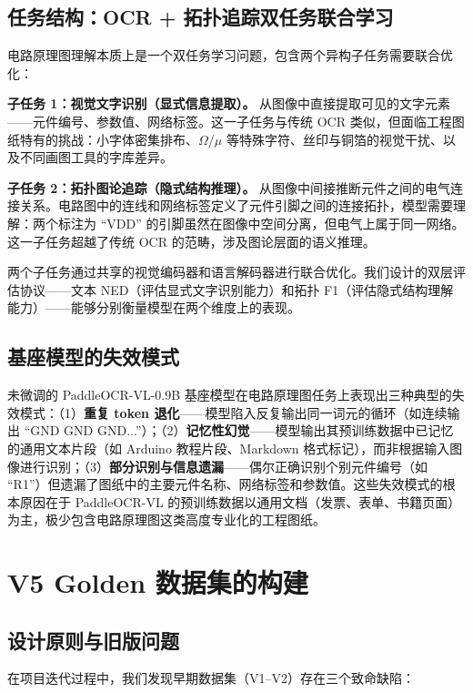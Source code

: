 \subsection{任务结构：OCR + 拓扑追踪双任务联合学习}

电路原理图理解本质上是一个双任务学习问题，包含两个异构子任务需要联合优化：

\textbf{子任务 1：视觉文字识别（显式信息提取）。} 从图像中直接提取可见的文字元素——元件编号、参数值、网络标签。这一子任务与传统 OCR 类似，但面临工程图纸特有的挑战：小字体密集排布、$\Omega$/$\mu$ 等特殊字符、丝印与铜箔的视觉干扰、以及不同画图工具的字库差异。

\textbf{子任务 2：拓扑图论追踪（隐式结构推理）。} 从图像中间接推断元件之间的电气连接关系。电路图中的连线和网络标签定义了元件引脚之间的连接拓扑，模型需要理解：两个标注为 ``VDD'' 的引脚虽然在图像中空间分离，但电气上属于同一网络。这一子任务超越了传统 OCR 的范畴，涉及图论层面的语义推理。

两个子任务通过共享的视觉编码器和语言解码器进行联合优化。我们设计的双层评估协议——文本 NED（评估显式文字识别能力）和拓扑 F1（评估隐式结构理解能力）——能够分别衡量模型在两个维度上的表现。

\subsection{基座模型的失效模式}

未微调的 PaddleOCR-VL-0.9B 基座模型在电路原理图任务上表现出三种典型的失效模式：（1）\textbf{重复 token 退化}——模型陷入反复输出同一词元的循环（如连续输出 ``GND GND GND...''）；（2）\textbf{记忆性幻觉}——模型输出其预训练数据中已记忆的通用文本片段（如 Arduino 教程片段、Markdown 格式标记），而非根据输入图像进行识别；（3）\textbf{部分识别与信息遗漏}——偶尔正确识别个别元件编号（如 ``R1''）但遗漏了图纸中的主要元件名称、网络标签和参数值。这些失效模式的根本原因在于 PaddleOCR-VL 的预训练数据以通用文档（发票、表单、书籍页面）为主，极少包含电路原理图这类高度专业化的工程图纸。


\section{V5 Golden 数据集的构建}

\subsection{设计原则与旧版问题}

在项目迭代过程中，我们发现早期数据集（V1--V2）存在三个致命缺陷：

